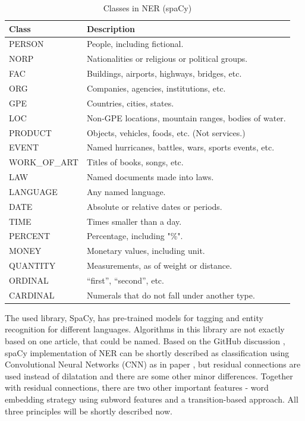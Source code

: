 \begin{table}[h]
\centering
\footnotesize
\begin{tabular}{ l p{} }
\hline
  \textbf{Class} & \textbf{Description} \\ \hline \hline
  PERSON & People, including fictional. \\ \hline
 NORP &  Nationalities or religious or political groups. \\ \hline
 FAC &  Buildings, airports, highways, bridges, etc. \\ \hline
 ORG &  Companies, agencies, institutions, etc.\\ \hline
 GPE &  Countries, cities, states.\\ \hline
 LOC &  Non-GPE locations, mountain ranges, bodies of water.\\ \hline
 PRODUCT &  Objects, vehicles, foods, etc. (Not services.)\\ \hline
 EVENT &  Named hurricanes, battles, wars, sports events, etc.\\ \hline
 WORK\_OF\_ART &  Titles of books, songs, etc.\\ \hline
 LAW &  Named documents made into laws.\\ \hline
 LANGUAGE &  Any named language.\\ \hline
 DATE &  Absolute or relative dates or periods.\\ \hline
 TIME &  Times smaller than a day.\\ \hline
 PERCENT &  Percentage, including "\%". \\ \hline
 MONEY &  Monetary values, including unit.\\ \hline
 QUANTITY &  Measurements, as of weight or distance.\\ \hline
 ORDINAL &  “first”, “second”, etc.\\ \hline
 CARDINAL &  Numerals that do not fall under another type.\\ \hline
 \end{tabular}
\caption{Classes in NER (spaCy)}
\label{tab:nerclasses}
\end{table}

 \par The used library, SpaCy, has pre-trained models for tagging and entity recognition for different languages. Algorithms in this library are not exactly based on one article, that could be named. Based on the GitHub discussion \cite{NERSpacy}, spaCy implementation of NER can be shortly described as classification using Convolutional Neural Networks (CNN) as in paper \cite{NERpaper}, but residual connections are used instead of dilatation and there are some other minor differences. Together with residual connections, there are two other important features - word embedding strategy using subword features and a transition-based approach. All three principles will be shortly described now. 
